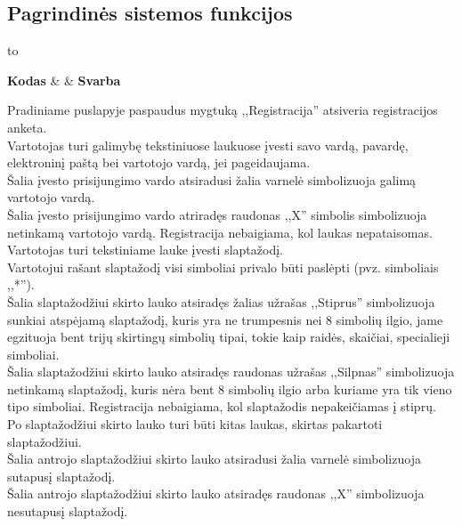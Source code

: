 \documentclass{VUMIFPSkursinis}
\begin{document}
	\subsection*{Pagrindinės sistemos funkcijos}
  \begin{longtabu} to 
    \caption{Pagrindinės sistemos funkcijos}
    \label{table:pagrindinesSistemosFunkcijos}
    \endfirsthead
    \endhead
    \hline
    \textbf{Kodas} &  & \textbf{Svarba} \\
    \hline
	
    {
      Pradiniame puslapyje paspaudus mygtuką ,,Registracija'' atsiveria registracijos anketa. \\
      Vartotojas turi galimybę tekstiniuose laukuose įvesti savo vardą, pavardę, elektroninį paštą bei vartotojo vardą, jei pageidaujama. \\
      Šalia įvesto prisijungimo vardo atsiradusi žalia varnelė simbolizuoja galimą vartotojo vardą. \\
      Šalia įvesto prisijungimo vardo atriradęs raudonas ,,X'' simbolis simbolizuoja netinkamą vartotojo vardą. Registracija nebaigiama, kol laukas nepataisomas. \\
      Vartotojas turi tekstiniame lauke įvesti slaptažodį. \\
      Vartotojui rašant slaptažodį visi simboliai privalo būti paslėpti (pvz. simboliais ,,*''). \\
      Šalia slaptažodžiui skirto lauko atsiradęs žalias užrašas ,,Stiprus'' simbolizuoja sunkiai atspėjamą slaptažodį,
			kuris yra ne trumpesnis nei 8 simbolių ilgio, jame egzituoja bent trijų skirtingų simbolių tipai, tokie kaip
			raidės, skaičiai, specialieji simboliai. \\
		  Šalia slaptažodžiui skirto lauko atsiradęs raudonas užrašas ,,Silpnas'' simbolizuoja netinkamą slaptažodį,
			kuris nėra bent 8 simbolių ilgio arba kuriame yra tik vieno tipo simboliai. Registracija nebaigiama, kol slaptažodis nepakeičiamas į stiprų. \\
      Po slaptažodžiui skirto lauko turi būti kitas laukas, skirtas pakartoti slaptažodžiui. \\
      Šalia antrojo slaptažodžiui skirto lauko atsiradusi žalia varnelė simbolizuoja sutapusį slaptažodį. \\
      Šalia antrojo slaptažodžiui skirto lauko atsiradęs raudonas ,,X'' simbolizuoja nesutapusį slaptažodį. \\
    }
	

\end{longtabu}
\end{document}
